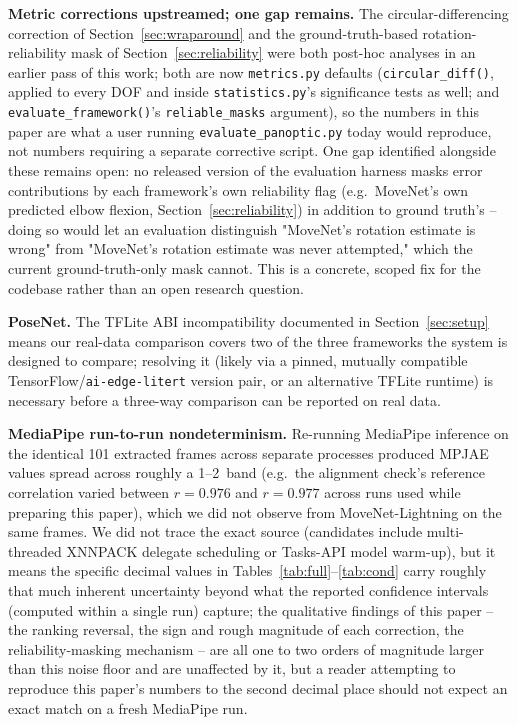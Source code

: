 \documentclass[conference]{IEEEtran}
\begin{document}
\textbf{Metric corrections upstreamed; one gap remains.} The
circular-differencing correction of Section~\ref{sec:wraparound} and the
ground-truth-based rotation-reliability mask of
Section~\ref{sec:reliability} were both post-hoc analyses in an earlier
pass of this work; both are now \texttt{metrics.py} defaults
(\texttt{circular\_diff()}, applied to every DOF and inside
\texttt{statistics.py}'s significance tests as well; and
\texttt{evaluate\_framework()}'s \texttt{reliable\_masks} argument),
so the numbers in this paper are what a user running
\texttt{evaluate\_panoptic.py} today would reproduce, not numbers
requiring a separate corrective script. One gap identified alongside
these remains open: no released version of the evaluation harness masks
error contributions by each framework's own reliability flag (e.g.\
MoveNet's own predicted elbow flexion, Section~\ref{sec:reliability}) in
addition to ground truth's -- doing so would let an evaluation
distinguish "MoveNet's rotation estimate is wrong" from "MoveNet's
rotation estimate was never attempted," which the current ground-truth-only
mask cannot. This is a concrete, scoped fix for the codebase rather than
an open research question.

\textbf{PoseNet.} The TFLite ABI incompatibility documented in
Section~\ref{sec:setup} means our real-data comparison covers two of the
three frameworks the system is designed to compare; resolving it
(likely via a pinned, mutually compatible TensorFlow/\texttt{ai-edge-litert}
version pair, or an alternative TFLite runtime) is necessary before a
three-way comparison can be reported on real data.

\textbf{MediaPipe run-to-run nondeterminism.} Re-running MediaPipe
inference on the identical 101 extracted frames across separate
processes produced MPJAE values spread across roughly a
1--2\textdegree\ band (e.g.\ the alignment check's reference correlation
varied between $r=0.976$ and $r=0.977$ across runs used while preparing
this paper), which we did not observe from MoveNet-Lightning on the same
frames. We did not trace the exact source (candidates include
multi-threaded XNNPACK delegate scheduling or Tasks-API model
warm-up), but it means the specific decimal values in
Tables~\ref{tab:full}--\ref{tab:cond} carry roughly that much inherent
uncertainty beyond what the reported confidence intervals (computed
within a single run) capture; the qualitative findings of this paper --
the ranking reversal, the sign and rough magnitude of each correction,
the reliability-masking mechanism -- are all one to two orders of
magnitude larger than this noise floor and are unaffected by it, but a
reader attempting to reproduce this paper's numbers to the second
decimal place should not expect an exact match on a fresh MediaPipe run.
\end{document}
